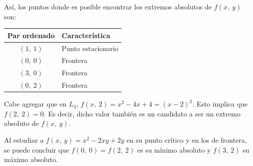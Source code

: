 \documentclass[12pt]{article}
\begin{document}
Así, los puntos donde es posible encontrar los extremos absolutos de $f(x, \ y)$ son:

\begin{table}[hbt!]
\centering

\begin{tabular}{c l}
Par ordenado & Característica \\
\hline
$(1, \ 1)$ & Punto estacionario \\
$(0, \ 0)$ & Frontera \\
$(3, \ 0)$ & Frontera \\
$(0, \ 2)$ & Frontera
\end{tabular}

\end{table}

Cabe agregar que en $L_{3}$, $f(x, \ 2) = x^{2} - 4x + 4 = (x - 2)^{2}$. Esto implica que $f(2, \ 2) = 0$. Es decir, dicho valor también es un candidato a ser un extremo absoluto de $f(x, \ y)$.

Al estudiar a $f(x, \ y) = x^{2} - 2xy + 2y$ en su punto crítico y en los de frontera, se puede concluir que $f(0, \ 0) = f(2, \ 2)$ es su mínimo absoluto y $f(3, \ 2)$ su máximo absoluto.
\end{document}
